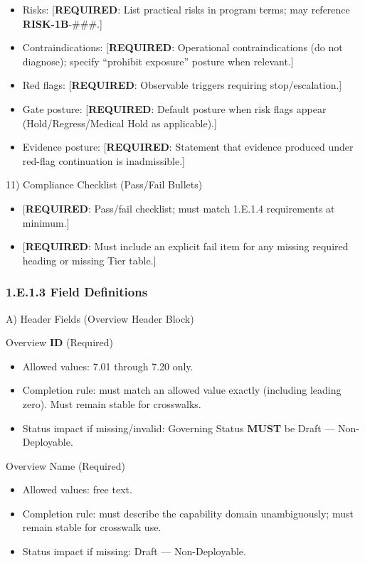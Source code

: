 \documentclass[10pt]{article}
\begin{document}
\begin{itemize}
\item Risks: [\textbf{REQUIRED}: List practical risks in program terms; may reference \textbf{RISK-1B}-\#\#\#.]
\item Contraindications: [\textbf{REQUIRED}: Operational contraindications (do not diagnose); specify “prohibit exposure” posture when relevant.]
\item Red flags: [\textbf{REQUIRED}: Observable triggers requiring stop/escalation.]
\item Gate posture: [\textbf{REQUIRED}: Default posture when risk flags appear (Hold/Regress/Medical Hold as applicable).]
\item Evidence posture: [\textbf{REQUIRED}: Statement that evidence produced under red-flag continuation is inadmissible.]
\end{itemize}

11) Compliance Checklist (Pass/Fail Bullets)

\begin{itemize}
\item {[\textbf{REQUIRED}: Pass/fail checklist; must match 1.E.1.4 requirements at minimum.]}
\item {[\textbf{REQUIRED}: Must include an explicit fail item for any missing required heading or missing Tier table.]}
\end{itemize}

\subsubsection*{1.E.1.3 Field Definitions}

A) Header Fields (Overview Header Block)

Overview \textbf{ID} (Required)

\begin{itemize}
\item Allowed values: 7.01 through 7.20 only.
\item Completion rule: must match an allowed value exactly (including leading zero). Must remain stable for crosswalks.
\item Status impact if missing/invalid: Governing Status \textbf{MUST} be Draft — Non-Deployable.
\end{itemize}

Overview Name (Required)

\begin{itemize}
\item Allowed values: free text.
\item Completion rule: must describe the capability domain unambiguously; must remain stable for crosswalk use.
\item Status impact if missing: Draft — Non-Deployable.
\end{itemize}
\end{document}
